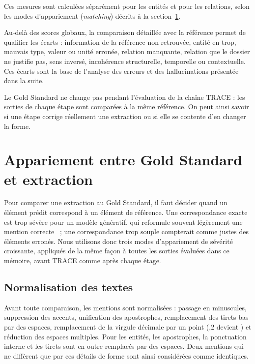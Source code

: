 Ces mesures sont calculées séparément pour les entités et pour les relations, selon les modes d’appariement (\emph{matching}) décrits à la section~\ref{sec:c4-matching}.

Au-delà des scores globaux, la comparaison détaillée avec la référence permet de qualifier les écarts : information de la référence non retrouvée, entité en trop, mauvais type, valeur ou unité erronée, relation manquante, relation que le dossier ne justifie pas, sens inversé, incohérence structurelle, temporelle ou contextuelle. Ces écarts sont la base de l’analyse des erreurs et des hallucinations présentée dans la suite.

Le Gold Standard ne change pas pendant l’évaluation de la chaîne TRACE : les sorties de chaque étape sont comparées à la même référence. On peut ainsi savoir si une étape corrige réellement une extraction ou si elle se contente d’en changer la forme.

\section{Appariement entre Gold Standard et extraction}\label{sec:c4-matching}

Pour comparer une extraction au Gold Standard, il faut décider quand un élément prédit correspond à un élément de référence. Une correspondance exacte est trop sévère pour un modèle génératif, qui reformule souvent légèrement une mention correcte~\cite{wadhwa2023revisiting} ; une correspondance trop souple compterait comme justes des éléments erronés. Nous utilisons donc trois modes d'appariement de sévérité croissante, appliqués de la même façon à toutes les sorties évaluées dans ce mémoire, avant TRACE comme après chaque étage.

\subsection{Normalisation des textes}

Avant toute comparaison, les mentions sont normalisées : passage en minuscules, suppression des accents, unification des apostrophes, remplacement des tirets bas par des espaces, remplacement de la virgule décimale par un point (,2 \fg{} devient  \fg{}) et réduction des espaces multiples. Pour les entités, les apostrophes, la ponctuation interne et les tirets sont en outre remplacés par des espaces. Deux mentions qui ne diffèrent que par ces détails de forme sont ainsi considérées comme identiques.


